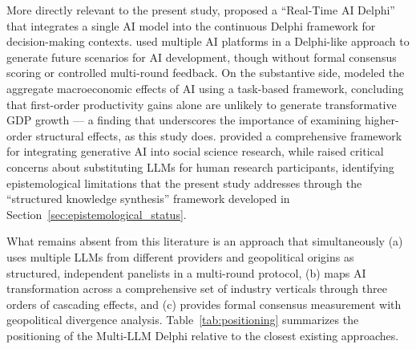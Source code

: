 \documentclass[preprint,review,12pt]{elsarticle}
\begin{document}
More directly relevant to the present study, \citet{calleo2025rtaidelphi} proposed a ``Real-Time AI Delphi'' that integrates a single AI model into the continuous Delphi framework for decision-making contexts. \citet{mostashari2025aivisions} used multiple AI platforms in a Delphi-like approach to generate future scenarios for AI development, though without formal consensus scoring or controlled multi-round feedback. On the substantive side, \citet{acemoglu2024simplemacro} modeled the aggregate macroeconomic effects of AI using a task-based framework, concluding that first-order productivity gains alone are unlikely to generate transformative GDP growth --- a finding that underscores the importance of examining higher-order structural effects, as this study does. \citet{bail2024genaisocialscience} provided a comprehensive framework for integrating generative AI into social science research, while \citet{crockett2024llmparticipants} raised critical concerns about substituting LLMs for human research participants, identifying epistemological limitations that the present study addresses through the ``structured knowledge synthesis'' framework developed in Section~\ref{sec:epistemological_status}.

What remains absent from this literature is an approach that simultaneously (a) uses multiple LLMs from different providers and geopolitical origins as structured, independent panelists in a multi-round protocol, (b) maps AI transformation across a comprehensive set of industry verticals through three orders of cascading effects, and (c) provides formal consensus measurement with geopolitical divergence analysis. Table~\ref{tab:positioning} summarizes the positioning of the Multi-LLM Delphi relative to the closest existing approaches.
\end{document}
